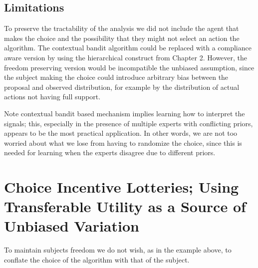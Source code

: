 




\subsection{Limitations}


To preserve the tractability of the analysis we did not include the agent that makes the choice and the possibility that they might not select an action the algorithm.
The contextual bandit algorithm could be replaced with a compliance aware version by using the hierarchical construct from Chapter 2.
However, the freedom preserving version would be incompatible the unbiased assumption, since the subject making the choice could introduce arbitrary bias between the proposal and observed distribution, for example by the distribution of actual actions not having full support.

Note contextual bandit based mechanism implies learning how to interpret the signals; this, especially in the presence of multiple experts with conflicting priors, appears to be the most practical application.
In other words, we are not too worried about what we lose from having to randomize the choice, since this is needed for learning when the experts disagree due to different priors. 





\section{Choice Incentive Lotteries;  Using Transferable Utility as a Source of Unbiased Variation}

To maintain subjects freedom we do not wish, as in the example above, to conflate the choice of the algorithm with that of the subject. 



